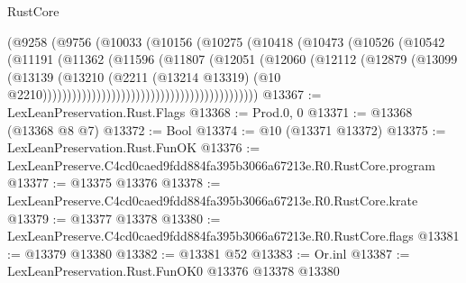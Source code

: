 \begin{lexlean}{RustCore}
\begin{coremodule}
                                                (@9258
                                                  (@9756
                                                    (@10033
                                                      (@10156
                                                        (@10275
                                                          (@10418
                                                            (@10473
                                                              (@10526
                                                                (@10542
                                                                  (@11191
                                                                    (@11362
                                                                      (@11596
                                                                        (@11807
                                                                          (@12051
                                                                            (@12060
                                                                              (@12112
                                                                                (@12879
                                                                                  (@13099
                                                                                    (@13139
                                                                                      (@13210
                                                                                        (@2211
                                                                                          (@13214
                                                                                            @13319)
                                                                                          (@10
                                                                                            @2210))))))))))))))))))))))))))))))))))))))))))))
@13367 := LexLeanPreservation.Rust.Flags
@13368 := Prod.{0, 0}
@13371 := @13368 (@13368 @8 @7)
@13372 := Bool
@13374 := @10 (@13371 @13372)
@13375 := LexLeanPreservation.Rust.FunOK
@13376 := LexLeanPreserve.C4cd0caed9fdd884fa395b3066a67213e.R0.RustCore.program
@13377 := @13375 @13376
@13378 := LexLeanPreserve.C4cd0caed9fdd884fa395b3066a67213e.R0.RustCore.krate
@13379 := @13377 @13378
@13380 := LexLeanPreserve.C4cd0caed9fdd884fa395b3066a67213e.R0.RustCore.flags
@13381 := @13379 @13380
@13382 := @13381 @52
@13383 := Or.inl
@13387 := LexLeanPreservation.Rust.FunOK0 @13376 @13378 @13380

\end{coremodule}
\end{lexlean}
